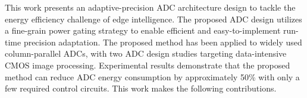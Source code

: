 
This work presents an adaptive-precision ADC architecture design to tackle the energy efficiency challenge of edge intelligence. 
The proposed ADC design utilizes a fine-grain power gating strategy to enable efficient and easy-to-implement run-time 
precision adaptation. The proposed method has been applied to widely used column-parallel ADCs, with two ADC design studies targeting 
data-intensive CMOS image processing. Experimental results demonstrate that the proposed method can reduce ADC energy consumption 
by approximately 50\% with only a few required control circuits. This work makes the following contributions. 




